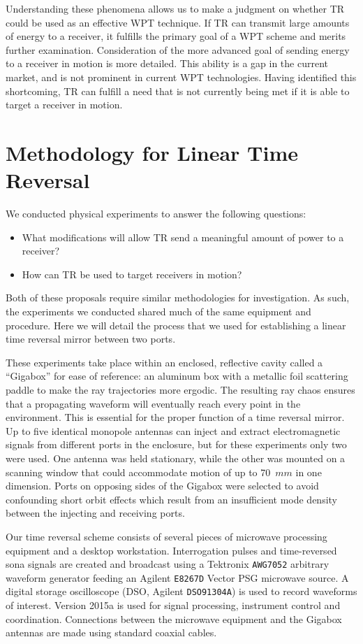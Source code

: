 Understanding these phenomena allows us to make a judgment on whether TR could be used as an effective WPT technique. If TR can transmit large amounts of energy to a receiver, it fulfills the primary goal of a WPT scheme and merits further examination. Consideration of the more advanced goal of sending energy to a receiver in motion is more detailed. This ability is a gap in the current market, and is not prominent in current WPT technologies. Having identified this shortcoming, TR can fulfill a need that is not currently being met if it is able to target a receiver in motion.

\section{Methodology for Linear Time Reversal}
\label{sec:ltr-meth}

We conducted physical experiments to answer the following questions:
\begin{itemize}
    \item What modifications will allow TR send a meaningful amount of power to a receiver?
    \item How can TR be used to target receivers in motion?
\end{itemize}
Both of these proposals require similar methodologies for investigation. As such, the experiments we conducted shared much of the same equipment and procedure. Here we will detail the process that we used for establishing a linear time reversal mirror between two ports.

These experiments take place within an enclosed, reflective cavity called a ``Gigabox'' for ease of reference: an aluminum box with a metallic foil scattering paddle to make the ray trajectories more ergodic. The resulting ray chaos ensures that a propagating waveform will eventually reach every point in the environment. This is essential for the proper function of a time reversal mirror. Up to five identical monopole antennas can inject and extract electromagnetic signals from different ports in the enclosure, but for these experiments only two were used. One antenna was held stationary, while the other was mounted on a scanning window that could accommodate motion of up to 70~$mm$ in one dimension. Ports on opposing sides of the Gigabox were selected to avoid confounding short orbit effects which result from an insufficient mode density between the injecting and receiving ports.

Our time reversal scheme consists of several pieces of microwave processing equipment and a desktop workstation. Interrogation pulses and time-reversed sona signals are created and broadcast using a Tektronix \texttt{AWG7052} arbitrary waveform generator feeding an Agilent \texttt{E8267D} Vector PSG microwave source. A digital storage oscilloscope (DSO, Agilent \texttt{DSO91304A}) is used to record waveforms of interest. \matlab{} Version 2015a is used for signal processing, instrument control and coordination. Connections between the microwave equipment and the Gigabox antennas are made using standard coaxial cables.

